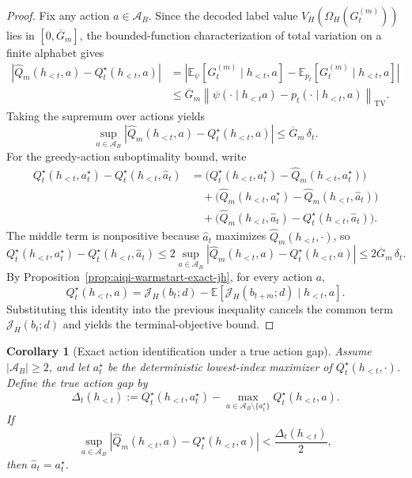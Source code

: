 \documentclass[11pt]{article}
\newtheorem{corollary}{Corollary}
\begin{document}
\begin{proof}
Fix any action $a\in\mathcal{A}_B$. Since the decoded label value
$V_H(\Omega_H(G_t^{(m)}))$ lies in $[0,\overline G_m]$, the bounded-function
characterization of total variation on a finite alphabet gives
\[
\begin{aligned}
\left|
\widehat Q_m(h_{<t},a)-Q_t^\star(h_{<t},a)
\right|
&=
\left|
\mathbb{E}_{\psi}\!\left[G_t^{(m)}\mid h_{<t},a\right]
-
\mathbb{E}_{p_t}\!\left[G_t^{(m)}\mid h_{<t},a\right]
\right|\\
&\le
\overline G_m
\left\|
\psi(\cdot\mid h_{<t}a)-p_t(\cdot\mid h_{<t},a)
\right\|_{\mathrm{TV}}.
\end{aligned}
\]
Taking the supremum over actions yields
\[
\sup_{a\in\mathcal{A}_B}
\left|
\widehat Q_m(h_{<t},a)-Q_t^\star(h_{<t},a)
\right|
\le
\overline G_m\,\delta_t.
\]
For the greedy-action suboptimality bound, write
\[
\begin{aligned}
Q_t^\star(h_{<t},a_t^\star)-Q_t^\star(h_{<t},\hat a_t)
&=
\bigl(Q_t^\star(h_{<t},a_t^\star)-\widehat Q_m(h_{<t},a_t^\star)\bigr)\\
&\quad+
\bigl(\widehat Q_m(h_{<t},a_t^\star)-\widehat Q_m(h_{<t},\hat a_t)\bigr)\\
&\quad+
\bigl(\widehat Q_m(h_{<t},\hat a_t)-Q_t^\star(h_{<t},\hat a_t)\bigr).
\end{aligned}
\]
The middle term is nonpositive because $\hat a_t$ maximizes
$\widehat Q_m(h_{<t},\cdot)$, so
\[
Q_t^\star(h_{<t},a_t^\star)-Q_t^\star(h_{<t},\hat a_t)
\le
2\sup_{a\in\mathcal{A}_B}
\left|
\widehat Q_m(h_{<t},a)-Q_t^\star(h_{<t},a)
\right|
\le
2\overline G_m\,\delta_t.
\]
By Proposition~\ref{prop:aiqi-warmstart-exact-jh}, for every action $a$,
\[
Q_t^\star(h_{<t},a)
=
\mathcal{J}_H(b_t;d)
-
\mathbb{E}\!\left[\mathcal{J}_H(b_{t+m};d)\mid h_{<t},a\right].
\]
Substituting this identity into the previous inequality cancels the common term
$\mathcal{J}_H(b_t;d)$ and yields the terminal-objective bound.
\end{proof}

\begin{corollary}[Exact action identification under a true action gap]
\label{cor:aiqi-warmstart-gap}
Assume $|\mathcal{A}_B|\ge 2$, and let $a_t^\star$ be the deterministic
lowest-index maximizer of $Q_t^\star(h_{<t},\cdot)$. Define the true action gap by
\[
\Delta_t(h_{<t})
:=
Q_t^\star(h_{<t},a_t^\star)
-
\max_{a\in\mathcal{A}_B\setminus\{a_t^\star\}}Q_t^\star(h_{<t},a).
\]
If
\[
\sup_{a\in\mathcal{A}_B}
\left|
\widehat Q_m(h_{<t},a)-Q_t^\star(h_{<t},a)
\right|
<
\frac{\Delta_t(h_{<t})}{2},
\]
then $\hat a_t=a_t^\star$.
\end{corollary}
\end{document}
